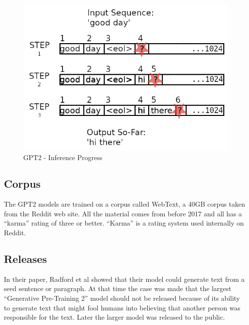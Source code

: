 \begin{figure}[H]
	\begin{center}
		
		
		\includegraphics[scale=2.0]{diagram-inference-02}
	\end{center}
	\caption[Generative Pre-Training 2 Inference]{GPT2 - Inference Progress}
	
	
\end{figure}

\subsection{Corpus}
The GPT2 models are trained on a corpus called WebText, a 40GB corpus taken from the Reddit web site. All the material comes from before 2017 and all has a ``karma'' rating of three or better. ``Karma'' is a rating system used internally on Reddit. 


\subsection{Releases}
In their paper, Radford et al \cite{radford2019language} showed that their model could generate text from a seed sentence or paragraph. At that time the case was made that the largest ``Generative Pre-Training 2'' model should not be released because of its ability to generate text that might fool humans into believing that another person was responsible for the text. Later the larger model was released to the public.

